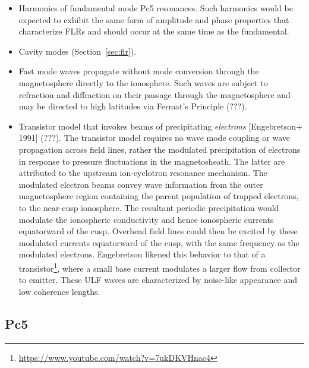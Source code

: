 \documentclass[
  notoc %
]{tufte-book}
\DeclareRobustCommand{\href}[2]{#2\footnote{\url{#1}}}
\providecommand{\tightlist}{%
  \setlength{\itemsep}{0pt}\setlength{\parskip}{0pt}
}
\begin{document}
\begin{itemize}
\tightlist
\item
  Harmonics of fundamental mode Pc5 resonances. Such harmonics would be
  expected to exhibit the same form of amplitude and phase properties
  that characterize FLRs and should occur at the same time as the
  fundamental.
\item
  Cavity modes (Section~\ref{sec:flr}).
\item
  Fast mode waves propagate without mode conversion through the
  magnetosphere directly to the ionosphere. Such waves are subject to
  refraction and diffraction on their passage through the magnetosphere
  and may be directed to high latitudes via Fermat's Principle (???).
\item
  Transistor model that invokes beams of precipitating \emph{electrons}
  {[}Engebretson+ 1991{]} (???). The transistor model requires no wave
  mode coupling or wave propagation across field lines, rather the
  modulated precipitation of electrons in response to pressure
  fluctuations in the magnetosheath. The latter are attributed to the
  upstream ion-cyclotron resonance mechanism. The modulated electron
  beams convey wave information from the outer magnetosphere region
  containing the parent population of trapped electrons, to the
  near-cusp ionosphere. The resultant periodic precipitation would
  modulate the ionospheric conductivity and hence ionospheric currents
  equatorward of the cusp. Overhead field lines could then be excited by
  these modulated currents equatorward of the cusp, with the same
  frequency as the modulated electrons. Engebretson likened this
  behavior to that of a
  \href{https://www.youtube.com/watch?v=7ukDKVHnac4}{transistor}, where
  a small base current modulates a larger flow from collector to
  emitter. These ULF waves are characterized by noise-like appearance
  and low coherence lengths.
\end{itemize}

\hypertarget{pc5}{%
\subsection{Pc5}\label{pc5}}
\end{document}
